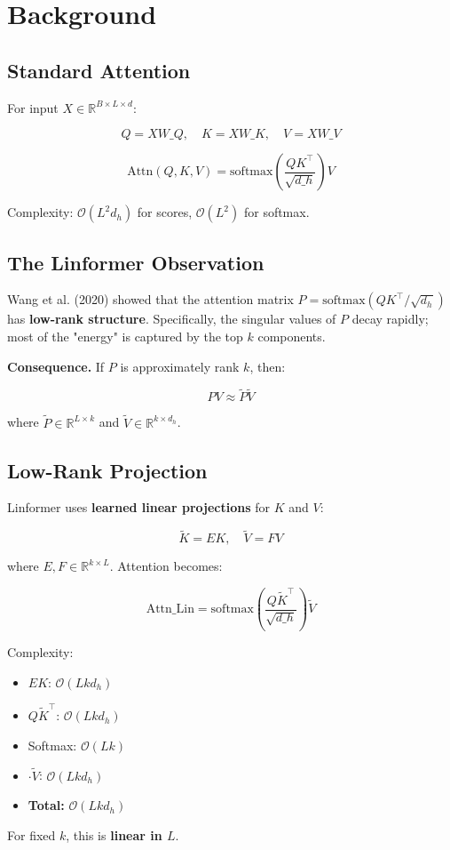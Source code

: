 \section{Background}

\subsection{Standard Attention}

For input $X \in \mathbb{R}^{B \times L \times d}$:

\[
Q = X W\_Q, \quad K = X W\_K, \quad V = X W\_V
\tag{3.1}
\]

\[
\text{Attn}(Q, K, V) = \text{softmax}\!\left(\frac{Q K^\top}{\sqrt{d\_h}}\right) V
\tag{3.2}
\]

Complexity: $\mathcal{O}(L^2 d_h)$ for scores, $\mathcal{O}(L^2)$ for softmax.

\subsection{The Linformer Observation}

Wang et al. (2020) showed that the attention matrix $P = \text{softmax}(QK^\top/\sqrt{d_h})$ 
has \textbf{low-rank structure}. Specifically, the singular values of $P$ decay 
rapidly; most of the "energy" is captured by the top $k$ components.

\textbf{Consequence.} If $P$ is approximately rank $k$, then:

\[
P V \approx \tilde{P} \tilde{V}
\tag{3.3}
\]

where $\tilde{P} \in \mathbb{R}^{L \times k}$ and $\tilde{V} \in \mathbb{R}^{k \times d_h}$.

\subsection{Low-Rank Projection}

Linformer uses \textbf{learned linear projections} for $K$ and $V$:

\[
\tilde{K} = E K, \quad \tilde{V} = F V
\tag{3.4}
\]

where $E, F \in \mathbb{R}^{k \times L}$. Attention becomes:

\[
\text{Attn}\_\text{Lin} = \text{softmax}\!\left(\frac{Q \tilde{K}^\top}{\sqrt{d\_h}}\right) \tilde{V}
\tag{3.5}
\]

Complexity: 
\begin{itemize}
\item $E K$: $\mathcal{O}(L k d_h)$
\item $Q \tilde{K}^\top$: $\mathcal{O}(L k d_h)$
\item Softmax: $\mathcal{O}(L k)$
\item $\cdot \tilde{V}$: $\mathcal{O}(L k d_h)$
\item \textbf{Total:} $\mathcal{O}(L k d_h)$

\end{itemize}
For fixed $k$, this is \textbf{linear in $L$}.

